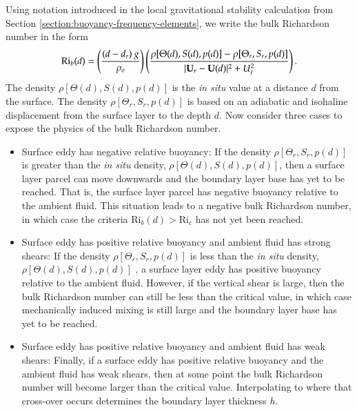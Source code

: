 Using notation introduced in the local gravitational stability
calculation from Section \ref{section:buoyancy-frequency-elements}, we
write the bulk Richardson number in the form
\begin{equation}
  \mbox{Ri}_{b}(d) = \left( \frac{(d-d_{r})  \, g}{\rho_{o}} \right) 
   \left( 
   \frac{\rho[\Theta(d), S(d), p(d)]   - \rho[\Theta_{r}, S_{r}, p(d)]}{ |{\bf U}_{r} - {\bf U}(d)|^{2} + U_{t}^{2}}
  \right). 
\label{eq:bulk-ri-large-kpp}
\end{equation}
The density $\rho[\Theta(d), S(d), p(d)]$ is the {\it in situ} value
at a distance $d$ from the surface.  The density $\rho[\Theta_{r},
S_{r}, p(d)]$ is based on an adiabatic and isohaline displacement from
the surface layer to the depth $d$.  Now consider three cases to
expose the physics of the bulk Richardson number.
\begin{itemize}

\item {\sc Surface eddy has negative relative buoyancy}: If the
  density $\rho[\Theta_{r}, S_{r}, p(d)]$ is greater than the {\it in
    situ} density, $\rho[\Theta(d), S(d), p(d)]$, then a surface layer
  parcel can move downwards and the boundary layer base has yet to be
  reached.  That is, the surface layer parcel has negative buoyancy
  relative to the ambient fluid.  This situation leads to a negative
  bulk Richardson number, in which case the criteria $\mbox{Ri}_{b}(d)
  > \mbox{Ri}_{c}$ has not yet been reached.

\item {\sc Surface eddy has positive relative buoyancy and ambient
    fluid has strong shears}: If the density $\rho[\Theta_{r}, S_{r},
  p(d)]$ is less than the {\it in situ} density, $\rho[\Theta(d),
  S(d), p(d)]$ , a surface layer eddy has positive buoyancy relative
  to the ambient fluid.  However, if the vertical shear is large, then
  the bulk Richardson number can still be less than the critical
  value, in which case mechanically induced mixing is still large and
  the boundary layer base has yet to be reached.

\item {\sc Surface eddy has positive relative buoyancy and ambient
    fluid has weak shears}: Finally, if a surface eddy has positive
  relative buoyancy and the ambient fluid has weak shears, then at
  some point the bulk Richardson number will become larger than the
  critical value.  Interpolating to where that cross-over occurs
  determines the boundary layer thickness $h$.  

\end{itemize}


